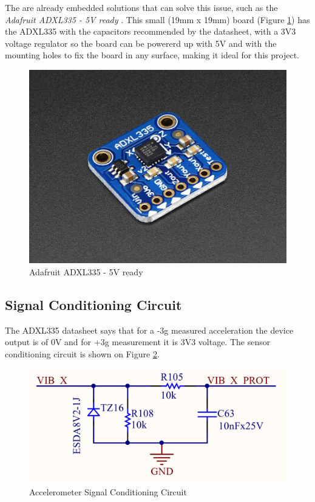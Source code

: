 	The are already embedded solutions that can solve this issue, such as the \textit{Adafruit ADXL335 - 5V ready} \cite{adafruit-5v-ready}. This small (19mm x 19mm) board (Figure \ref{fig:adafruit-adxl335}) has the ADXL335 with the capacitors recommended by the datasheet, with a 3V3 voltage regulator so the board can be powererd up with 5V and with the mounting holes to fix the board in any surface, making it ideal for this project.

	\begin{figure}[htbp]
		\centering
		\includegraphics[width=.5\textwidth]{figuras/fig-adafruit-adxl335.jpg}
		\caption{Adafruit ADXL335 - 5V ready \cite{adafruit-adxl335}}
		\label{fig:adafruit-adxl335}
	\end{figure}


\subsection{Signal Conditioning Circuit}\label{ssec:accelerometer-signal-conditioning-circuit}

	The ADXL335 datasheet \cite{devices2010adxl335} says that for a -3g measured acceleration the device output is of 0V and for +3g measurement it is 3V3 voltage. The sensor conditioning circuit is shown on Figure \ref{fig:accelerometer-signal-conditioning-circuit}.

	\begin{figure}[htbp]
		\centering
		\includegraphics[width=.8\textwidth]{figuras/fig-accelerometer-signal-conditioning-circuit}
		\caption{Accelerometer Signal Conditioning Circuit}
		\label{fig:accelerometer-signal-conditioning-circuit}
	\end{figure}


